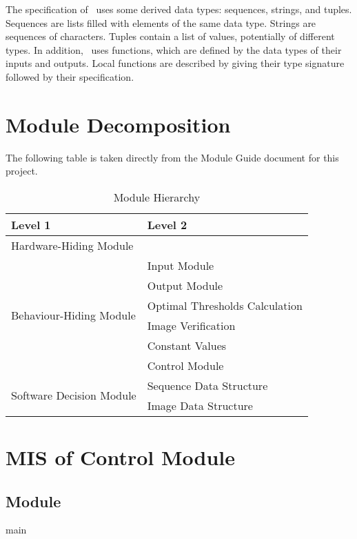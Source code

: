 \documentclass[12pt, titlepage]{article}
\begin{document}
\noindent
The specification of \progname \ uses some derived data types: sequences,
strings, and
tuples. Sequences are lists filled with elements of the same data type. Strings
are sequences of characters. Tuples contain a list of values, potentially of
different types. In addition, \progname \ uses functions, which
are defined by the data types of their inputs and outputs. Local functions are
described by giving their type signature followed by their specification.

\section{Module Decomposition}

The following table is taken directly from the Module Guide document for this
project.

\begin{table}[h!]
\centering
\begin{tabular}{p{} p{}}
\toprule
\textbf{Level 1} & \textbf{Level 2}\\
\midrule

{Hardware-Hiding Module} & ~ \\
\midrule

\multirow{6}{0.3\textwidth}{Behaviour-Hiding Module}
& Input Module\\
& Output Module\\
& Optimal Thresholds Calculation\\
& Image Verification\\
& Constant Values\\
& Control Module\\
\midrule

\multirow{2}{0.3\textwidth}{Software Decision Module}
& Sequence Data Structure\\
& Image Data Structure\\
\bottomrule

\end{tabular}
\caption{Module Hierarchy}
\label{TblMH}
\end{table}

\newpage

\section{MIS of Control Module} \label{Md_Control}
\subsection{Module}
main
\end{document}
